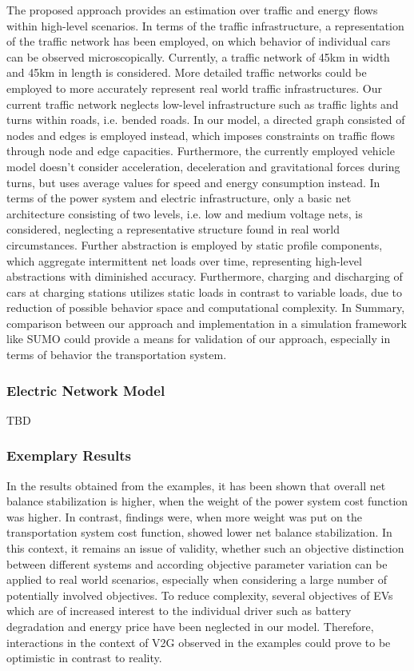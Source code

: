 The proposed approach provides an estimation over traffic and energy flows within high-level scenarios. In terms of the traffic infrastructure, a representation of the traffic network has been employed, on which behavior of individual cars can be observed microscopically. Currently, a traffic network of 45km in width and 45km in length is considered. More detailed traffic networks could be employed to more accurately represent real world traffic infrastructures. Our current traffic network neglects low-level infrastructure such as traffic lights and turns within roads, i.e. bended roads. In our model, a directed graph consisted of nodes and edges is employed instead, which imposes constraints on traffic flows through node and edge capacities. Furthermore, the currently employed vehicle model doesn't consider acceleration, deceleration and gravitational forces during turns, but uses average values for speed and energy consumption instead. In terms of the power system and electric infrastructure, only a basic net architecture consisting of two levels, i.e. low and medium voltage nets, is considered, neglecting a representative structure found in real world circumstances. Further abstraction is employed by static profile components, which aggregate intermittent net loads over time, representing high-level abstractions with diminished accuracy. Furthermore, charging and discharging of cars at charging stations utilizes static loads in contrast to variable loads, due to reduction of possible behavior space and computational complexity. In Summary, comparison between our approach and implementation in a simulation framework like SUMO could provide a means for validation of our approach, especially in terms of behavior the transportation system.

\subsubsection{Electric Network Model}

TBD

\subsubsection{Exemplary Results}

In the results obtained from the examples, it has been shown that overall net balance stabilization is higher, when the weight of the power system cost function was higher. In contrast, findings were, when more weight was put on the transportation system cost function, showed lower net balance stabilization. In this context, it remains an issue of validity, whether such an objective distinction between different systems and according objective parameter variation can be applied to real world scenarios, especially when considering a large number of potentially involved objectives. To reduce complexity, several objectives of EVs which are of increased interest to the individual driver such as battery degradation and energy price have been neglected in our model. Therefore, interactions in the context of V2G observed in the examples could prove to be optimistic in contrast to reality. 

